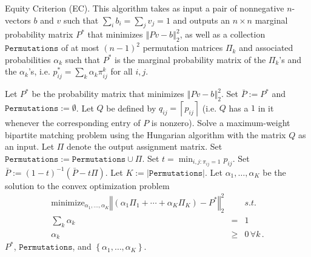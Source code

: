 \documentclass[prodmode,acmec]{acmsmall}
\begin{document}
\begin{algorithm}
\caption{Equity Criterion (EC). This algorithm takes as input a pair
  of nonnegative $n$-vectors $b$ and $v$ such that
  $\sum_{i}b_{i}=\sum_{j}v_{j}=1$ and outputs an $n\times n$ marginal
  probability matrix $P^{*}$ that minimizes $\left\Vert
  Pv-b\right\Vert _{2}^{2}$, as well as a collection
  $\mathtt{Permutations}$ of at most $(n-1)^{2}$ permutation matrices
  $\Pi_{k}$ and associated probabilities $\alpha_{k}$ such that
  $P^{*}$ is the marginal probability matrix of the $\Pi_{k}$'s and
  the $\alpha_{k}$'s, i.e. $p_{ij}^{*}=\sum_{k}\alpha_{k}\pi_{ij}^{k}$
  for all $i,j$.  }
\label{alg:find-equitable}
\begin{algorithmic}
\STATE Let $P^{*}$ be the probability matrix that minimizes $\left\Vert Pv-b\right\Vert _{2}^{2}$.
\STATE {}
\STATE Set $\bar{P}:=P^{*}$ and $\mathtt{Permutations}:=\emptyset$.
\STATE Let $Q$ be defined by $q_{ij}=\left\lceil p_{ij}\right\rceil $ (i.e.
$Q$ has a $1$ in it whenever the corresponding entry of $P$ is
nonzero).
\STATE Solve a maximum-weight bipartite matching problem using the Hungarian
algorithm \cite{burkard2009assignment} with the matrix $Q$ as an
input. Let $\Pi$ denote the output assignment matrix.
\STATE {}
\STATE Set $\mathtt{Permutations}:=\mathtt{Permutations}\cup\Pi$.
\STATE Set $t=\min_{i,j:\pi_{ij}=1}p_{ij}$.
\STATE Set $\bar{P}:=(1-t)^{-1}(\bar{P}-t\Pi)$.
\STATE {}
\ENDWHILE
\STATE {}
\STATE Let $K:=\left|\mathtt{Permutations}\right|$. Let $\alpha_{1},\dots,\alpha_{K}$
be the solution to the convex optimization problem\begin{eqnarray*}
\mathrm{minimize}_{\alpha_{1},\dots,\alpha_{K}}\left\Vert (\alpha_{1}\Pi_{1}+\cdots+\alpha_{K}\Pi_{K})-P^{*}\right\Vert _{2}^{2} &  & s.t.\\
\sum_{k}\alpha_{k} & = & 1\\
\alpha_{k} & \geq & 0\,\forall k\,.\end{eqnarray*}
\RETURN $P^{*}$, $\mathtt{Permutations}$, and $\left\{ \alpha_{1},\dots,\alpha_{K}\right\} $.
\end{algorithmic}
\end{algorithm}
\end{document}
